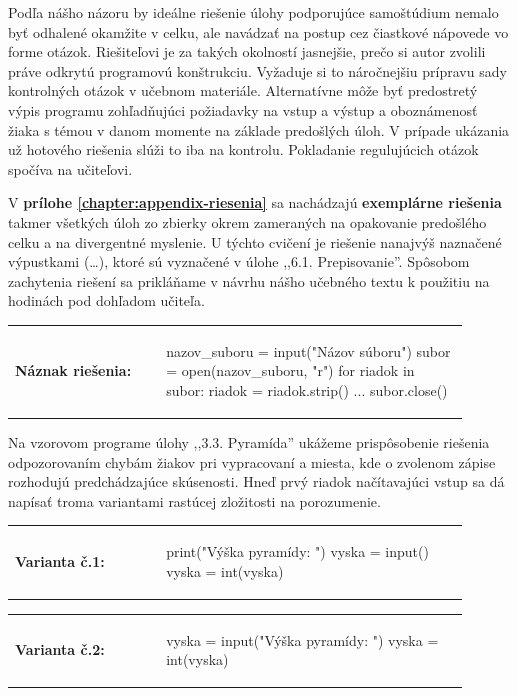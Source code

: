 Podľa nášho názoru by ideálne riešenie úlohy podporujúce samoštúdium nemalo byť odhalené okamžite v celku, ale navádzať na postup cez čiastkové nápovede vo forme otázok. Riešiteľovi je za takých okolností jasnejšie, prečo si autor zvolili práve odkrytú programovú konštrukciu. Vyžaduje si to náročnejšiu prípravu sady kontrolných otázok v učebnom materiále. Alternatívne môže byť predostretý výpis programu zohľadňujúci požiadavky na vstup a výstup a oboznámenosť žiaka s témou v danom momente na základe predošlých úloh. V prípade ukázania už hotového riešenia slúži to iba na kontrolu. Pokladanie regulujúcich otázok spočíva na učiteľovi. 

V \textbf{prílohe \ref{chapter:appendix-riesenia}} sa nachádzajú \textbf{exemplárne riešenia} takmer všetkých úloh zo zbierky okrem zameraných na opakovanie predošlého celku a na divergentné myslenie. U týchto cvičení je riešenie nanajvýš naznačené výpustkami (\dots), ktoré sú vyznačené v úlohe ,,6.1. Prepisovanie''. Spôsobom zachytenia riešení sa prikláňame v návrhu nášho učebného textu k použitiu na hodinách pod dohľadom učiteľa. 

\begin{tabular}{@{}p{0.3\linewidth}p{0.6\linewidth}}
\textbf{\small Náznak riešenia:} &
\vspace{-1em}
\begin{solution}
nazov_suboru = input("Názov súboru")
subor = open(nazov_suboru, "r")
for riadok in subor:
    riadok = riadok.strip()
    ...
subor.close()
\end{solution}
\end{tabular}

Na vzorovom programe úlohy ,,3.3. Pyramída'' ukážeme prispôsobenie riešenia odpozorovaním chybám žiakov pri vypracovaní a miesta, kde o zvolenom zápise rozhodujú predchádzajúce skúsenosti. Hneď prvý riadok načítavajúci vstup sa dá napísať troma variantami rastúcej zložitosti na porozumenie. 

\begin{tabular}{@{}p{0.3\linewidth}p{0.6\linewidth}}
\textbf{\small Varianta č.1:} &
\vspace{-1em}
\begin{solution}
print("Výška pyramídy: ")
vyska = input()
vyska = int(vyska)
\end{solution}
\end{tabular}

\vspace{-2em}
\begin{tabular}{@{}p{0.3\linewidth}p{0.6\linewidth}}
\textbf{\small Varianta č.2:} &
\vspace{-1em}
\begin{solution}
vyska = input("Výška pyramídy: ")
vyska = int(vyska)
\end{solution}
\end{tabular}

